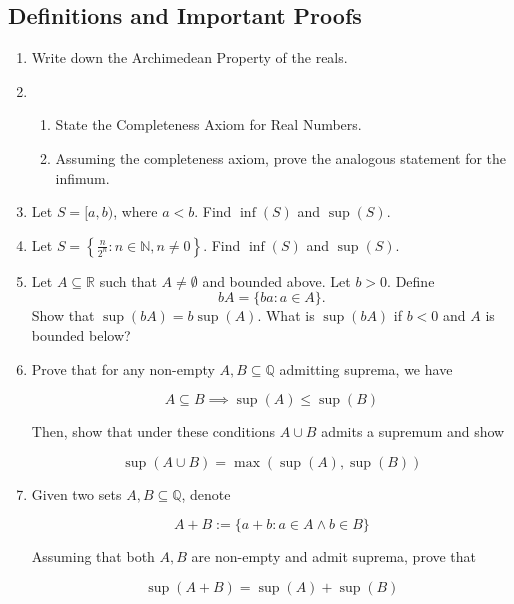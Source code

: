\documentclass{article}
\theoremstyle{definition}
\begin{document}
\subsection{Definitions and Important Proofs}

\begin{enumerate}

    \item Write down the Archimedean Property of the reals.

    \item 
    
        \begin{enumerate}
        \item State the Completeness Axiom for Real Numbers.
        \item Assuming the completeness axiom, prove the analogous statement for the infimum.
        \end{enumerate}


    \item Let \( S = [a, b) \), where \( a < b \). Find \( \inf(S) \) and \( \sup(S) \).

    \item 
    Let \( S = \left\{ \frac{n}{2^{n}} : n \in \mathbb{N}, n \neq 0 \right\} \). Find \( \inf(S) \) and \( \sup(S) \).

    \item
    Let \( A \subseteq \mathbb{R} \) such that \( A \neq \emptyset \) and bounded above. Let \( b > 0 \). Define 
    \[ 
    bA = \{ba : a \in A\}.
    \]
    Show that \( \sup(bA) = b\sup(A) \). What is \( \sup(bA) \) if \( b < 0 \) and \( A \) is bounded below?

    \item Prove that for any non-empty $A,B \subseteq \mathbb{Q}$ admitting suprema, we have 

    \[ A \subseteq B \implies \sup(A) \leq \sup(B)\]

    Then, show that under these conditions $A \cup B$ admits a supremum and show

    \[ \sup(A \cup B) = \max(\sup(A), \sup(B))\]
    \item 

    Given two sets $A,B \subseteq \mathbb{Q}$, denote 

    \[ A + B := \{a + b : a \in A \land b \in B \}\]

    Assuming that both $A,B$ are non-empty and admit suprema, prove that 

    \[ \sup(A + B) = \sup(A) + \sup(B)\]


\end{enumerate}
\end{document}

